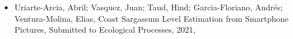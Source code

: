\begin{itemize} 
\item Uriarte-Arcia, Abril; Vasquez, Juan; Taud, Hind; Garcia-Floriano, Andrés; Ventura-Molina, Elias, Coast Sargassum Level Estimation from Smartphone Pictures, Submitted to Ecological Processes, 2021, \href{https://arxiv.org/abs/3939932}{\faFilePdfO} 
\end{itemize} 
